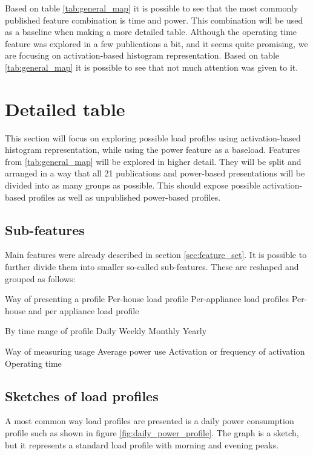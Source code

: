 Based on table \ref{tab:general_map} it is possible to see that the most commonly
published feature combination is time and power. This combination will be used 
as a baseline when making a more detailed table. Although the operating time feature was 
explored in a few publications a bit, and it seems quite promising, we are 
focusing on activation-based histogram representation.
Based on table \ref{tab:general_map} it is possible to see that not much attention was given to it. 

\section{Detailed table}

This section will focus on exploring possible load profiles using activation-based histogram representation,
while using the power feature as a baseload. 
Features from \ref{tab:general_map} will be explored in higher detail. 
They will be split and arranged in a way that all 21 publications and power-based presentations will be divided into as many groups as possible. 
This should expose possible activation-based profiles as well as unpublished power-based profiles.

\subsection{Sub-features} \label{sec:subfeatures}

Main features were already described in section \ref{sec:feature_set}.
It is possible to further divide them into smaller so-called sub-features.
These are reshaped and grouped as follows:
\begin{outline}

\1 Way of presenting a profile
\2 Per-house load profile
\2 Per-appliance load profiles
\2 Per-house and per appliance load profile

\1 By time range of profile 
\2 Daily
\2 Weekly
\2 Monthly
\2 Yearly

\1 Way of measuring usage
\2 Average power use 
\2 Activation or frequency of activation
\2 Operating time
\end{outline}

\subsection{Sketches of load profiles}
A most common way load profiles are presented is a daily power consumption profile such as shown in figure \ref{fig:daily_power_profile}. 
The graph is a sketch, but it represents a standard load profile with morning and evening peaks.

